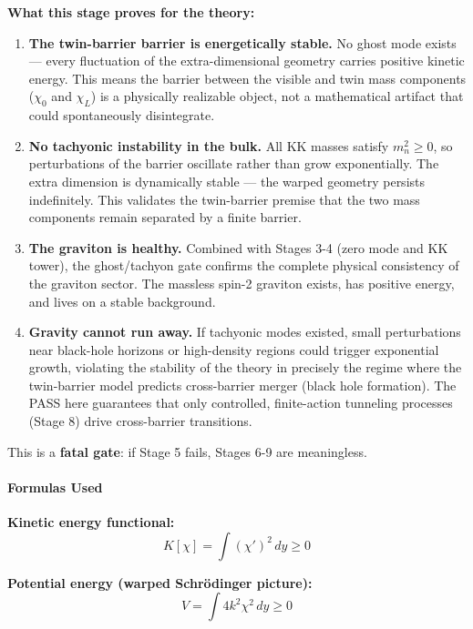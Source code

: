 \documentclass[
  11pt,
]{article}
\begin{document}
\textbf{What this stage proves for the theory:}

\begin{enumerate}
\def\labelenumi{\arabic{enumi}.}
\item
  \textbf{The twin-barrier barrier is energetically stable.} No ghost
  mode exists --- every fluctuation of the extra-dimensional geometry
  carries positive kinetic energy. This means the barrier between the
  visible and twin mass components (\(\chi_0\) and \(\chi_L\)) is a
  physically realizable object, not a mathematical artifact that could
  spontaneously disintegrate.
\item
  \textbf{No tachyonic instability in the bulk.} All KK masses satisfy
  \(m_n^2 \geq 0\), so perturbations of the barrier oscillate rather
  than grow exponentially. The extra dimension is dynamically stable ---
  the warped geometry persists indefinitely. This validates the
  twin-barrier premise that the two mass components remain separated by
  a finite barrier.
\item
  \textbf{The graviton is healthy.} Combined with Stages 3-4 (zero mode
  and KK tower), the ghost/tachyon gate confirms the complete physical
  consistency of the graviton sector. The massless spin-2 graviton
  exists, has positive energy, and lives on a stable background.
\item
  \textbf{Gravity cannot run away.} If tachyonic modes existed, small
  perturbations near black-hole horizons or high-density regions could
  trigger exponential growth, violating the stability of the theory in
  precisely the regime where the twin-barrier model predicts
  cross-barrier merger (black hole formation). The PASS here guarantees
  that only controlled, finite-action tunneling processes (Stage 8)
  drive cross-barrier transitions.
\end{enumerate}

This is a \textbf{fatal gate}: if Stage 5 fails, Stages 6-9 are
meaningless.

\bigskip

\hypertarget{formulas-used-4}{%
\paragraph{Formulas Used}\label{formulas-used-4}}

\textbf{Kinetic energy functional:}
\[K[\chi] = \int (\chi')^2\,dy \geq 0 \tag{121}\]

\textbf{Potential energy (warped Schrödinger picture):}
\[V = \int 4k^2\chi^2\,dy \geq 0 \tag{122}\]
\end{document}
